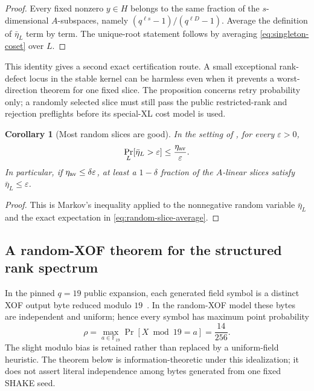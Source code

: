 \documentclass[11pt]{article}
\newtheorem{corollary}[corollary]{Corollary}
\newcommand{\F}{\mathbb F}
\begin{document}
\begin{proof}
Every fixed nonzero $y\in H$ belongs to the same fraction of the
$s$-dimensional $A$-subspaces, namely
$(q^{\ell s}-1)/(q^{\ell D}-1)$.  Average the definition of $\bar\eta_L$
term by term.  The unique-root statement follows by averaging
\eqref{eq:singleton-coset} over $L$.
\end{proof}

This identity gives a second exact certification route.  A small exceptional
rank-defect locus in the stable kernel can be harmless even when it prevents a
worst-direction theorem for one fixed slice.  The proposition concerns retry
probability only; a randomly selected slice must still pass the public
restricted-rank and rejection preflights before its special-XL cost model is
used.

\begin{corollary}[Most random slices are good]\label{cor:random-slice-markov}
In the setting of , for every $\varepsilon>0$,
\begin{equation}\label{eq:random-slice-markov}
 \Pr_L[\bar\eta_L>\varepsilon]
 \le \frac{\eta_{\rm av}}{\varepsilon}.
\end{equation}
In particular, if $\eta_{\rm av}\le\delta\varepsilon$, at least a
$1-\delta$ fraction of the $A$-linear slices satisfy
$\bar\eta_L\le\varepsilon$.
\end{corollary}

\begin{proof}
This is Markov's inequality applied to the nonnegative random variable
$\bar\eta_L$ and the exact expectation in
\eqref{eq:random-slice-average}.
\end{proof}

\subsection{A random-XOF theorem for the structured rank spectrum}
\label{sec:seeded-spectrum}

In the pinned $q=19$ public expansion, each generated field symbol is a
distinct XOF output byte reduced modulo $19$~\cite{SNOVA23}.  In the
random-XOF model these bytes are independent and uniform; hence every symbol
has maximum point probability
\begin{equation}\label{eq:rho-mod19}
 \rho=\max_{a\in\F_{19}}\Pr[X\bmod19=a]=\frac{14}{256}.
\end{equation}
The slight modulo bias is retained rather than replaced by a uniform-field
heuristic.  The theorem below is information-theoretic under this idealization;
it does not assert literal independence among bytes generated from one fixed
SHAKE seed.
\end{document}
